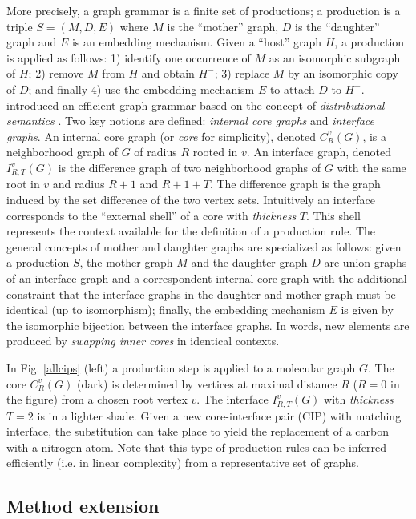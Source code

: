 \documentclass{article}
\begin{document}
More precisely, a graph grammar \citep{rozenberg1999handbook} is a finite set
of productions; a production is a triple $S=(M,D,E)$ where $M$ is the
``mother'' graph, $D$ is the ``daughter'' graph and $E$ is an embedding
mechanism. Given a ``host'' graph $H$, a production is applied as follows: 1)
identify one occurrence of $M$ as an isomorphic subgraph of $H$; 2) remove $M$
from $H$ and obtain $H^-$; 3) replace $M$ by an isomorphic copy of $D$; and
finally 4) use the embedding mechanism $E$ to attach $D$ to $H^-$.
\cite{costa16} introduced an efficient graph grammar based on the concept
of {\em distributional semantics}
\citep{harris1954distributional,harris1968mathematical}. Two
key notions are defined: {\em internal core graphs} and {\em interface graphs}. An
internal core graph (or {\em core} for simplicity), denoted $C^v_R(G)$, is a
neighborhood graph of $G$ of radius $R$ rooted in $v$. An interface graph,
denoted $I^v_{R,T}(G)$ is the difference graph of two neighborhood graphs of
$G$ with the same root in $v$ and radius $R+1$ and $R+1+T$. The difference graph
is the graph induced by the set difference of the two vertex sets. Intuitively
an interface corresponds to the ``external shell'' of a core with {\em
thickness} $T$. This shell represents the context available for the definition
of a production rule. The general concepts of mother and daughter graphs are
specialized as follows: given a production $S$, the mother graph $M$ and the
daughter graph $D$ are union graphs of an interface graph and a correspondent
internal core graph with the additional constraint that the interface graphs
in the daughter and mother graph must be identical (up to isomorphism);
finally, the embedding mechanism $E$ is given by the isomorphic bijection
between the interface graphs. In words, new elements are produced by {\em
swapping inner cores} in identical contexts.

In Fig. \ref{allcips} (left) a production step is applied to a molecular graph
$G$. The core $C_{R}^v(G)$ (dark) is determined by vertices at maximal
distance $R$ ($R=0$ in the figure) from a chosen root vertex $v$. The
interface $I_{R,T}^v(G)$ with \emph{thickness} $T=2$ is in a lighter shade.
Given a new core-interface pair (CIP) with matching interface, the
substitution can take place to yield the replacement of a carbon with a
nitrogen atom.
Note that this type of production rules can be inferred efficiently (i.e. in
linear complexity) from a representative set of graphs.



\subsection{Method extension}
\end{document}
